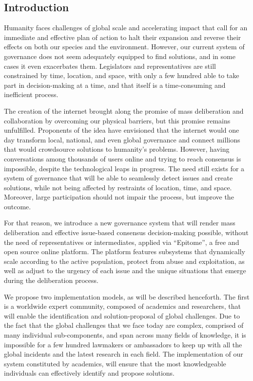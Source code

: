 \documentclass[a4paper,11pt]{article}
\begin{document}
\begin{multicols}{2}

\section{Introduction} \label{introduction}

Humanity faces challenges of global scale and accelerating impact that call for an immediate and effective plan of action to halt their expansion and reverse their effects on both our species and the environment. However, our current system of governance does not seem adequately equipped to find solutions, and in some cases it even exacerbates them. Legislators and representatives are still constrained by time, location, and space, with only a few hundred able to take part in decision-making at a time, and that itself is a time-consuming and inefficient process.

The creation of the internet brought along the promise of mass deliberation and collaboration by overcoming our physical barriers, but this promise remains unfulfilled. Proponents of the idea have envisioned that the internet would one day transform local, national, and even global governance and connect millions that would crowdsource solutions to humanity's problems. However, having conversations among thousands of users online and trying to reach consensus is impossible, despite the technological leaps in progress. The need still exists for a system of governance that will be able to seamlessly detect issues and create solutions, while not being affected by restraints of location, time, and space. Moreover, large participation should not impair the process, but improve the outcome.

For that reason, we introduce a new governance system that will render mass deliberation and effective issue-based consensus decision-making possible, without the need of representatives or intermediates, applied via ``Epitome'', a free and open source online platform. The platform features subsystems that dynamically scale according to the active population, protect from abuse and exploitation, as well as adjust to the urgency of each issue and the unique situations that emerge during the deliberation process.

We propose two implementation models, as will be described henceforth. The first is a worldwide expert community, composed of academics and researchers, that will enable the identification and solution-proposal of global challenges. Due to the fact that the global challenges that we face today are complex, comprised of many individual sub-components, and span across many fields of knowledge, it is impossible for a few hundred lawmakers or ambassadors to keep up with all the global incidents and the latest research in each field. The implementation of our system constituted by academics, will ensure that the most knowledgeable individuals can effectively identify and propose solutions.


\end{multicols}
\end{document}

